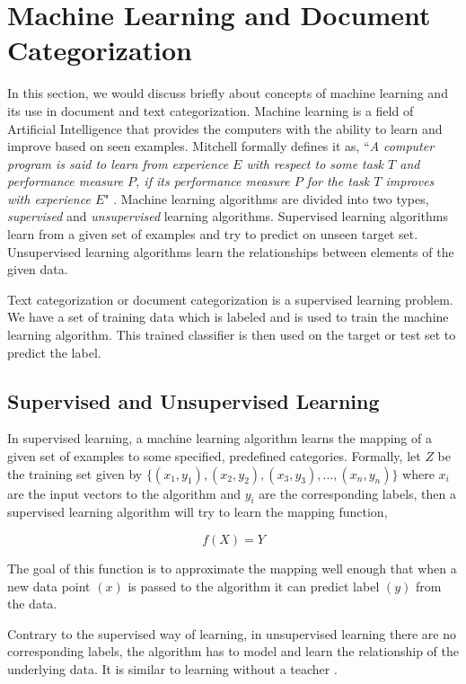 
\section{Machine Learning and Document Categorization}
In this section, we would discuss briefly about concepts of machine learning and its use in document and text categorization.  Machine learning is a field of Artificial Intelligence that provides the computers with the ability to learn and improve based on seen examples. Mitchell formally defines it as, ``\textit{A computer program is said to learn from experience $E$ with respect to some task $T$ and performance measure $P$, if its performance measure $P$ for the task $T$ improves with experience $E$}" \cite{Mitchell:1997:ML:541177}. Machine learning algorithms are divided into two types, \textit{supervised} and \textit{unsupervised} learning algorithms. Supervised learning algorithms learn from a given set of examples and try to predict on unseen target set. Unsupervised learning algorithms learn the relationships between elements of the given data. 

Text categorization or document categorization is a supervised learning problem. We have a set of training data which is labeled and is used to train the machine learning algorithm. This trained classifier is then used on the target or test set to predict the label.

\subsection{Supervised and Unsupervised Learning}
In supervised learning, a machine learning algorithm learns the mapping of a given set of examples to some specified, predefined categories. Formally, let $Z$ be the training set given by $\{(x_{1},y_{1}), (x_{2},y_{2}), (x_{3},y_{3}),...,(x_{n},y_{n})\}$ where $x_{i}$ are the input vectors to the algorithm and $y_{i}$ are the corresponding labels, then a supervised learning algorithm will try to learn the mapping function,

\begin{equation}
    f(X)  = Y
\end{equation}

The goal of this function is to approximate the mapping well enough that when a new data point $(x)$ is passed to the algorithm it can predict label $(y)$ from the data.

Contrary to the supervised way of learning, in unsupervised learning there are no corresponding labels, the algorithm has to model and learn the relationship of the underlying data. It is similar to learning without a teacher \cite{hinton1999unsupervised}.  

